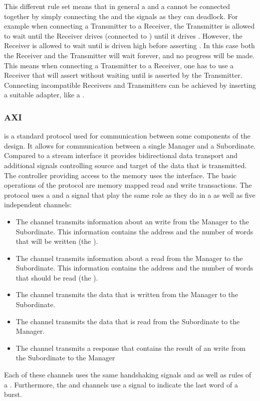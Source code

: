 This different rule set means that in general a \AXIStream{} and a \ValidNextStream{} cannot be connected together by simply connecting the \TREADY{} and the \NEXT{} signals as they can deadlock. For example when connecting a \ValidNextStream{} Transmitter to a \AXIStream{} Receiver, the \ValidNextStream{} Transmitter is allowed to wait until the \AXIStream{} Receiver drives \TREADY{} (connected to \NEXT{}) until it drives \TVALID{}. However, the \AXIStream{} Receiver is allowed to wait until \TVALID{} is driven high before asserting \TREADY{}. In this case both the Receiver and the Transmitter will wait forever, and no progress will be made. This means when connecting a \ValidNextStream{} Transmitter to a \AXIStream{} Receiver, one has to use a \AXIStream{} Receiver that will assert \TREADY{} without waiting until \TVALID{} is asserted by the Transmitter. Connecting incompatible Receivers and Transmitters can be achieved by inserting a suitable adapter, like a \SKIDBuffer{}.

\subsubsection{AXI}\label{sec:AXI}
\AXI{}\autocite{ref:axi} is a standard protocol used for communication between some components of the \FPGA{} design. It allows for communication between a single Manager and a Subordinate. Compared to a stream interface it provides bidirectional data transport and additional signals controlling source and target of the data that is transmitted. The \DDR{} controller providing access to the \DDR{} memory uses the \AXI{} interface.
The basic operations of the \AXI{} protocol are memory mapped read and write transactions.
The \AXI{} protocol uses a \ACLK{} and a \ARESETn{} signal that play the same role as they do in a \AXIStream{} as well as five independent channels:
\begin{itemize}
  \item The \AW{} channel transmits information about an write from the Manager to the Subordinate. This information contains the address and the number of words that will be written (the \burstsize{}).
  \item The \AR{} channel transmits information about a read from the Manager to the Subordinate. This information contains the address and the number of words that should be read (the \burstsize{}).
  \item The \W{} channel transmits the data that is written from the Manager to the Subordinate.
  \item The \R{} channel transmits the data that is read from the Subordinate to the Manager.
  \item The \B{} channel transmits a response that contains the result of an write from the Subordinate to the Manager
\end{itemize}
Each of these channels uses the same handshaking signals \READY{} and \VALID{} as well as rules of a \AXIStream{}. Furthermore, the \W{} and \R{} channels use a \LAST{} signal to indicate the last word of a burst.

